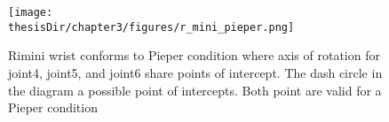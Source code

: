 \begin{figure}
  \centering
  \captionsetup{justification=centering}
  \texttt{[image: \\thesisDir/chapter3/figures/r\_mini\_pieper.png]}
  \caption{Rimini wrist conforms to Pieper condition where axis of rotation 
  for joint4, joint5, and joint6 share points of intercept. The dash circle in the 
  diagram a possible point of intercepts. Both point are valid for a Pieper condition}
  \label{fig:r_mini_pieper}
\end{figure}

